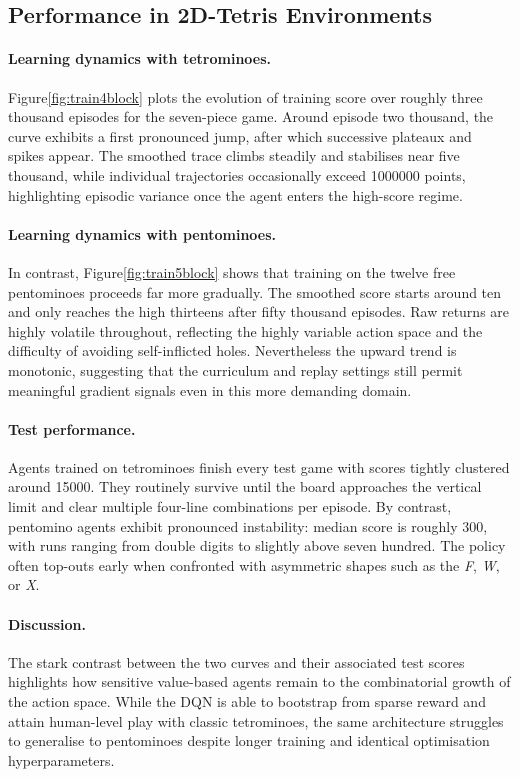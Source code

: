 \subsection{Performance in 2D-Tetris Environments}

\paragraph{Learning dynamics with tetrominoes.}
Figure\ref{fig:train4block} plots the evolution of training score over roughly three thousand episodes for the seven-piece game. Around episode two thousand, the curve exhibits a first pronounced jump, after which successive plateaux and spikes appear. The smoothed trace climbs steadily and stabilises near five thousand, while individual trajectories occasionally exceed 1000000 points, highlighting episodic variance once the agent enters the high-score regime.

\paragraph{Learning dynamics with pentominoes.}
In contrast, Figure\ref{fig:train5block} shows that training on the twelve free pentominoes proceeds far more gradually.  The smoothed score starts around ten and only reaches the high thirteens after fifty thousand episodes.  Raw returns are highly volatile throughout, reflecting the highly variable action space and the difficulty of avoiding self-inflicted holes.  Nevertheless the upward trend is monotonic, suggesting that the curriculum and replay settings still permit meaningful gradient signals even in this more demanding domain.

\paragraph{Test performance.}
Agents trained on tetrominoes finish every test game with scores tightly clustered around 15000. They routinely survive until the board approaches the vertical limit and clear multiple four-line combinations per episode.  By contrast, pentomino agents exhibit pronounced instability: median score is roughly 300, with runs ranging from double digits to slightly above seven hundred.  The policy often top-outs early when confronted with asymmetric shapes such as the \emph{F}, \emph{W}, or \emph{X}.

\paragraph{Discussion.}
The stark contrast between the two curves and their associated test scores highlights how sensitive value-based agents remain to the combinatorial growth of the action space.  While the DQN is able to bootstrap from sparse reward and attain human-level play with classic tetrominoes, the same architecture struggles to generalise to pentominoes despite longer training and identical optimisation hyperparameters. 

